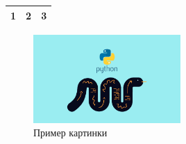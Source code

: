 \documentclass{article}
\begin{document}
\begin{tabular}{|c|c|c|}
\hline
1&2&3 \\
\hline
\end{tabular}
\begin{figure}
\centering
\includegraphics[width=0.5\textwidth]{image.jpg}
\caption{Пример картинки}
\label{fig:example}
\end{figure}
\end{document}
